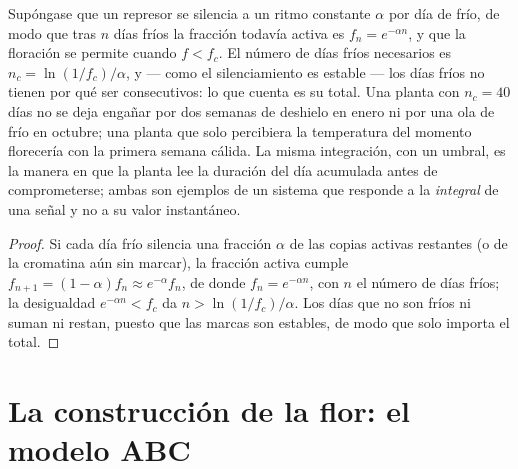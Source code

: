 \begin{theorem}\label{thm:b2:plant-flowering:integration}
Supóngase que un represor se silencia a un ritmo constante $\alpha$ por
día de frío, de modo que tras $n$ días fríos la fracción todavía activa
es $f_n = e^{-\alpha n}$, y que la floración se permite cuando $f < f_c$.
El número de días fríos necesarios es $n_c = \ln(1/f_c)/\alpha$, y --- como
el silenciamiento es estable --- los días fríos no tienen por qué ser
consecutivos: lo que cuenta es su total. Una planta con $n_c = 40$
días no se deja engañar por dos semanas de deshielo en enero ni por una
ola de frío en octubre; una planta que solo percibiera la temperatura del
momento florecería con la primera semana cálida. La misma integración,
con un umbral, es la manera en que la planta lee la duración del día
acumulada antes de comprometerse; ambas son ejemplos de un sistema que
responde a la \emph{integral} de una señal y no a su valor instantáneo.
\end{theorem}
\begin{proof}
Si cada día frío silencia una fracción $\alpha$ de las copias activas
restantes (o de la cromatina aún sin marcar), la fracción activa cumple
$f_{n+1} = (1 - \alpha)f_n \approx e^{-\alpha}f_n$,
de donde $f_n = e^{-\alpha n}$, con $n$ el número de días fríos; la
desigualdad $e^{-\alpha n} < f_c$ da $n > \ln(1/f_c)/\alpha$. Los días que
no son fríos ni suman ni restan, puesto que las marcas son estables, de
modo que solo importa el total.
\end{proof}

\section{La construcción de la flor: el modelo ABC}

